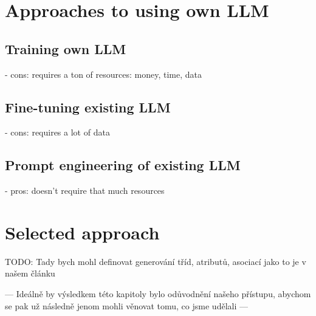 \section{Approaches to using own LLM}

\subsection{Training own LLM}
- cons: requires a ton of resources: money, time, data


\subsection{Fine-tuning existing LLM}
- cons: requires a lot of data


\subsection{Prompt engineering of existing LLM}
- pros: doesn't require that much resources


\section{Selected approach}

TODO: Tady bych mohl definovat generování tříd, atributů, asociací jako to je v našem článku


--- Ideálně by výsledkem této kapitoly bylo odůvodnění našeho přístupu, abychom se pak už následně jenom mohli věnovat tomu, co jsme udělali ---